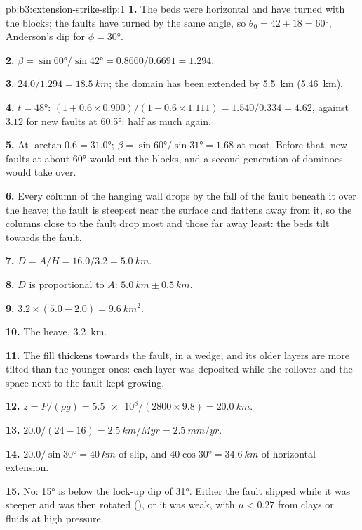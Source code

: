\begin{solution}{pb:b3:extension-strike-slip:1}
\textbf{1.} The beds were horizontal and have turned with the blocks; the
faults have turned by the same angle, so $\theta_0 = 42 + 18 = \ang{60}$,
Anderson's dip for $\phi = \ang{30}$.

\textbf{2.} $\beta = \sin\ang{60}/\sin\ang{42} = 0.8660/0.6691 = 1.294$.

\textbf{3.} $24.0/1.294 = \qty{18.5}{km}$; the domain has been extended by
\qty{5.5}{km} (\qty{5.46}{km}).

\textbf{4.} $t = \ang{48}$: $(1 + 0.6\times0.900)/(1 - 0.6\times1.111) =
1.540/0.334 = 4.62$, against $3.12$ for new faults at \ang{60.5}: half as
much again.

\textbf{5.} At $\arctan0.6 = \ang{31.0}$; $\beta = \sin\ang{60}/\sin\ang{31}
= 1.68$ at most. Before that, new faults at about \ang{60} would cut the
blocks, and a second generation of dominoes would take over.

\textbf{6.} Every column of the hanging wall drops by the fall of the fault
beneath it over the heave; the fault is steepest near the surface and flattens
away from it, so the columns close to the fault drop most and those far away
least: the beds tilt towards the fault.

\textbf{7.} $D = A/H = 16.0/3.2 = \qty{5.0}{km}$.

\textbf{8.} $D$ is proportional to $A$: $\qty{5.0}{km} \pm \qty{0.5}{km}$.

\textbf{9.} $3.2\times(5.0 - 2.0) = \qty{9.6}{km^2}$.

\textbf{10.} The heave, \qty{3.2}{km}.

\textbf{11.} The fill thickens towards the fault, in a wedge, and its older
layers are more tilted than the younger ones: each layer was deposited while
the rollover and the space next to the fault kept growing.

\textbf{12.} $z = P/(\rho g) = \num{5.5e8}/(2800\times9.8) = \qty{20.0}{km}$.

\textbf{13.} $20.0/(24 - 16) = \qty{2.5}{km/Myr} = \qty{2.5}{mm/yr}$.

\textbf{14.} $20.0/\sin\ang{30} = \qty{40}{km}$ of slip, and $40\cos\ang{30} =
\qty{34.6}{km}$ of horizontal extension.

\textbf{15.} No: \ang{15} is below the lock-up dip of \ang{31}. Either the
fault slipped while it was steeper and was then rotated (), or
it was weak, with $\mu < 0.27$ from clays or fluids at high pressure.


\end{solution}
